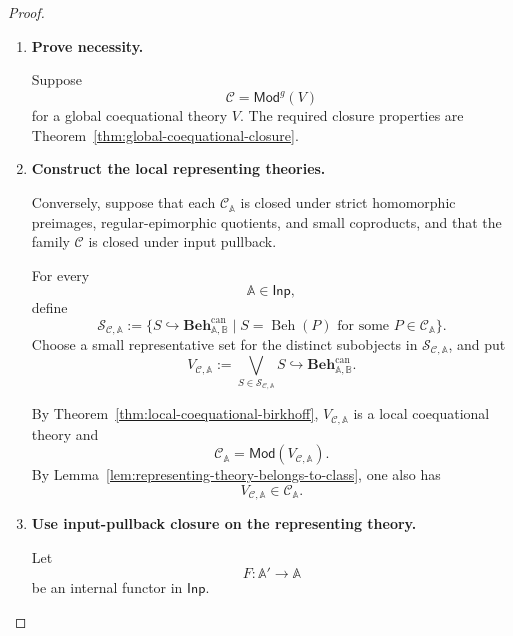 \begin{proof}
    \leavevmode
    \begin{enumerate}
        \item \textbf{Prove necessity.}

        Suppose
        \[
            \mathcal C=\mathsf{Mod}^{g}(V)
        \]
        for a global coequational theory \(V\). The required closure
        properties are
        Theorem~\ref{thm:global-coequational-closure}.

        \item \textbf{Construct the local representing theories.}

        Conversely, suppose that each \(\mathcal C_{\mathbb A}\) is closed
        under strict homomorphic preimages, regular-epimorphic quotients, and
        small coproducts, and that the family \(\mathcal C\) is closed under
        input pullback.

        For every
        \[
            \mathbb A\in\mathsf{Inp},
        \]
        define
        \[
            \mathcal S_{\mathcal C,\mathbb A}
            :=
            \{
                S\hookrightarrow
                \mathbf{Beh}^{\mathrm{can}}_{\mathbb A,\mathbb B}
                \mid
                S=\operatorname{Beh}(P)
                \text{ for some }P\in\mathcal C_{\mathbb A}
            \}.
        \]
        Choose a small representative set for the distinct subobjects in
        \(\mathcal S_{\mathcal C,\mathbb A}\), and put
        \[
            V_{\mathcal C,\mathbb A}
            :=
            \bigvee_{S\in\mathcal S_{\mathcal C,\mathbb A}}S
            \hookrightarrow
            \mathbf{Beh}^{\mathrm{can}}_{\mathbb A,\mathbb B}.
        \]

        By Theorem~\ref{thm:local-coequational-birkhoff},
        \(V_{\mathcal C,\mathbb A}\) is a local coequational theory and
        \[
            \mathcal C_{\mathbb A}
            =
            \mathsf{Mod}(V_{\mathcal C,\mathbb A}).
        \]
        By
        Lemma~\ref{lem:representing-theory-belongs-to-class},
        one also has
        \[
            V_{\mathcal C,\mathbb A}
            \in
            \mathcal C_{\mathbb A}.
        \]

        \item \textbf{Use input-pullback closure on the representing
        theory.}

        Let
        \[
            F:\mathbb A'\to\mathbb A
        \]
        be an internal functor in \(\mathsf{Inp}\).


\end{enumerate}
\end{proof}

